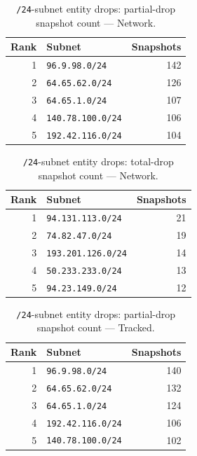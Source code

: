 \documentclass[conference]{IEEEtran}
\begin{document}
\begin{table}[H]
\caption{\texttt{/24}-subnet entity drops: partial-drop snapshot count --- Network.}
\begin{center}\small
\begin{tabular}{|r|l|r|}
\hline
\textbf{Rank} & \textbf{Subnet} & \textbf{Snapshots} \\ \hline
1 & \texttt{96.9.98.0/24} & 142 \\ \hline
2 & \texttt{64.65.62.0/24} & 126 \\ \hline
3 & \texttt{64.65.1.0/24} & 107 \\ \hline
4 & \texttt{140.78.100.0/24} & 106 \\ \hline
5 & \texttt{192.42.116.0/24} & 104 \\ \hline
\end{tabular}
\label{tab:subnetdrop_partial_network}
\end{center}\end{table}
 
\begin{table}[H]
\caption{\texttt{/24}-subnet entity drops: total-drop snapshot count --- Network.}
\begin{center}\small
\begin{tabular}{|r|l|r|}
\hline
\textbf{Rank} & \textbf{Subnet} & \textbf{Snapshots} \\ \hline
1 & \texttt{94.131.113.0/24} & 21 \\ \hline
2 & \texttt{74.82.47.0/24} & 19 \\ \hline
3 & \texttt{193.201.126.0/24} & 14 \\ \hline
4 & \texttt{50.233.233.0/24} & 13 \\ \hline
5 & \texttt{94.23.149.0/24} & 12 \\ \hline
\end{tabular}
\label{tab:subnetdrop_total_network}
\end{center}\end{table}
 
\begin{table}[H]
\caption{\texttt{/24}-subnet entity drops: partial-drop snapshot count --- Tracked.}
\begin{center}\small
\begin{tabular}{|r|l|r|}
\hline
\textbf{Rank} & \textbf{Subnet} & \textbf{Snapshots} \\ \hline
1 & \texttt{96.9.98.0/24} & 140 \\ \hline
2 & \texttt{64.65.62.0/24} & 132 \\ \hline
3 & \texttt{64.65.1.0/24} & 124 \\ \hline
4 & \texttt{192.42.116.0/24} & 106 \\ \hline
5 & \texttt{140.78.100.0/24} & 102 \\ \hline
\end{tabular}
\label{tab:subnetdrop_partial_tracked}
\end{center}\end{table}
 
\end{document}
